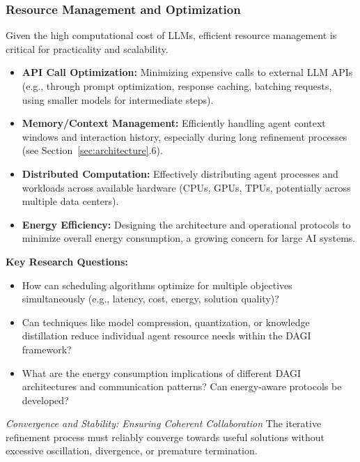\documentclass[12pt]{amsart}
\begin{document}
\subsubsection{Resource Management and Optimization}
\label{subsubsec:resource_mgmt}
Given the high computational cost of LLMs, efficient resource management is critical for practicality and scalability.
\begin{itemize}[leftmargin=*]
    \item \textbf{API Call Optimization:} Minimizing expensive calls to external LLM APIs (e.g., through prompt optimization, response caching, batching requests, using smaller models for intermediate steps).
    \item \textbf{Memory/Context Management:} Efficiently handling agent context windows and interaction history, especially during long refinement processes (see Section~\ref{sec:architecture}.6).
    \item \textbf{Distributed Computation:} Effectively distributing agent processes and workloads across available hardware (CPUs, GPUs, TPUs, potentially across multiple data centers).
    \item \textbf{Energy Efficiency:} Designing the architecture and operational protocols to minimize overall energy consumption, a growing concern for large AI systems.
\end{itemize}
\textbf{Key Research Questions:}
\begin{itemize}[leftmargin=*, label={--}]
    \item How can scheduling algorithms optimize for multiple objectives simultaneously (e.g., latency, cost, energy, solution quality)?
    \item Can techniques like model compression, quantization, or knowledge distillation reduce individual agent resource needs within the DAGI framework?
    \item What are the energy consumption implications of different DAGI architectures and communication patterns? Can energy-aware protocols be developed?
\end{itemize}

\textit{Convergence and Stability: Ensuring Coherent Collaboration}
\label{subsec:convergence}
The iterative refinement process must reliably converge towards useful solutions without excessive oscillation, divergence, or premature termination.
\end{document}
